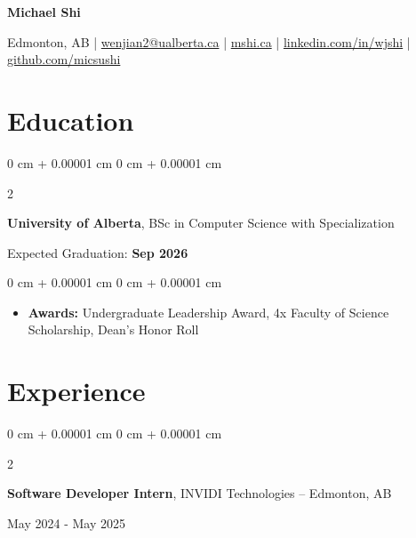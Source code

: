 \documentclass[10pt, letterpaper]{article}
\newenvironment{onecolentry}{
    \begin{adjustwidth}{
        0 cm + 0.00001 cm
    }{
        0 cm + 0.00001 cm
    }
}{
    \end{adjustwidth}
}
\newenvironment{twocolentry}[2][]{
    \onecolentry
    \def\secondColumn{#2}
    \setcolumnwidth{\fill, 6 cm}
    \begin{paracol}{2}
}{
    \switchcolumn \raggedleft \secondColumn
    \end{paracol}
    \endonecolentry
}
\begin{document}
    \begin{center}
        {\fontsize{24pt}{24pt}\selectfont\textbf{Michael Shi}}

        \vspace{0.2cm}

        Edmonton, AB | \href{mailto:wenjian2@ualberta.ca}{wenjian2@ualberta.ca} | \href{https://mshi.ca}{mshi.ca} | \href{https://linkedin.com/in/wjshi}{linkedin.com/in/wjshi} | \href{https://github.com/micsushi}{github.com/micsushi}
    \end{center}

    \vspace{0.10 cm}
    \section{Education}

    \begin{twocolentry}{Expected Graduation: \textbf{Sep 2026}}
        \textbf{University of Alberta}, BSc in Computer Science with Specialization
    \end{twocolentry}

    \vspace{0.10 cm}
    \begin{onecolentry}
        \begin{itemize}[leftmargin=2em, itemsep=1pt, parsep=0pt, topsep=0pt, partopsep=0pt]
            \item \textbf{Awards:} Undergraduate Leadership Award, 4x Faculty of Science Scholarship, Dean's Honor Roll
        \end{itemize}
    \end{onecolentry}

    \vspace{0.10 cm}
    \section{Experience}


    \begin{twocolentry}{May 2024 - May 2025}
        \textbf{Software Developer Intern}, INVIDI Technologies -- Edmonton, AB
    \end{twocolentry}
\end{document}
